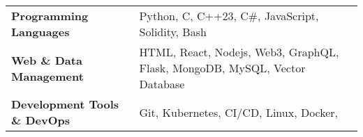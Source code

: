 \begin{tabularx}{\linewidth}{l >{\raggedright\arraybackslash}X}
    \textbf{Programming Languages} & Python, C, C++23, C\#, JavaScript, Solidity, Bash \\
    \textbf{Web \& Data Management} & HTML, React, Nodejs, Web3, GraphQL, Flask, MongoDB, MySQL, Vector Database \\
    \textbf{Development Tools \& DevOps} & Git, Kubernetes, CI/CD, Linux, Docker,  \\
\end{tabularx}